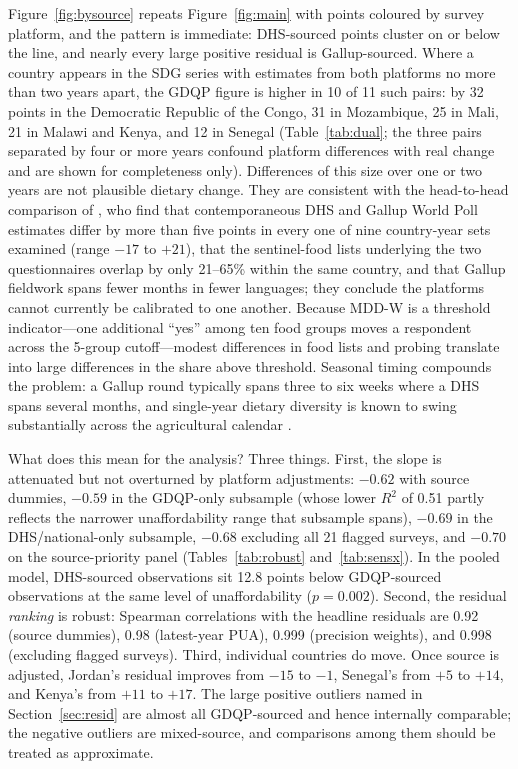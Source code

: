 \documentclass[11pt]{article}
\begin{document}
Figure~\ref{fig:bysource} repeats Figure~\ref{fig:main} with points coloured by survey platform, and the pattern is immediate: DHS-sourced points cluster on or below the line, and nearly every large positive residual is Gallup-sourced. Where a country appears in the SDG series with estimates from both platforms no more than two years apart, the GDQP figure is higher in 10 of 11 such pairs: by 32 points in the Democratic Republic of the Congo, 31 in Mozambique, 25 in Mali, 21 in Malawi and Kenya, and 12 in Senegal (Table~\ref{tab:dual}; the three pairs separated by four or more years confound platform differences with real change and are shown for completeness only). Differences of this size over one or two years are not plausible dietary change. They are consistent with the head-to-head comparison of \citet{hanleycook2025}, who find that contemporaneous DHS and Gallup World Poll estimates differ by more than five points in every one of nine country-year sets examined (range $-17$ to $+21$), that the sentinel-food lists underlying the two questionnaires overlap by only 21--65\% within the same country, and that Gallup fieldwork spans fewer months in fewer languages; they conclude the platforms cannot currently be calibrated to one another. Because MDD-W is a threshold indicator---one additional ``yes'' among ten food groups moves a respondent across the 5-group cutoff---modest differences in food lists and probing translate into large differences in the share above threshold. Seasonal timing compounds the problem: a Gallup round typically spans three to six weeks where a DHS spans several months, and single-year dietary diversity is known to swing substantially across the agricultural calendar \citep{hanleycook2025, fao2021}.

What does this mean for the analysis? Three things. First, the slope is attenuated but not overturned by platform adjustments: $-0.62$ with source dummies, $-0.59$ in the GDQP-only subsample (whose lower $R^2$ of 0.51 partly reflects the narrower unaffordability range that subsample spans), $-0.69$ in the DHS/national-only subsample, $-0.68$ excluding all 21 flagged surveys, and $-0.70$ on the source-priority panel (Tables~\ref{tab:robust} and~\ref{tab:sensx}). In the pooled model, DHS-sourced observations sit 12.8 points below GDQP-sourced observations at the same level of unaffordability ($p=0.002$). Second, the residual \emph{ranking} is robust: Spearman correlations with the headline residuals are 0.92 (source dummies), 0.98 (latest-year PUA), 0.999 (precision weights), and 0.998 (excluding flagged surveys). Third, individual countries do move. Once source is adjusted, Jordan's residual improves from $-15$ to $-1$, Senegal's from $+5$ to $+14$, and Kenya's from $+11$ to $+17$. The large positive outliers named in Section~\ref{sec:resid} are almost all GDQP-sourced and hence internally comparable; the negative outliers are mixed-source, and comparisons among them should be treated as approximate.
\end{document}
